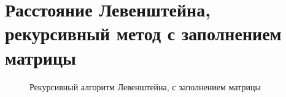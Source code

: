 \documentclass[12pt,a4paper]{report}
\begin{document}
\section*{Расстояние Левенштейна, рекурсивный метод с заполнением матрицы}
\begin{figure}[ht]
	\caption{Рекурсивный алгоритм Левенштейна, с заполнением матрицы}
\end{figure}


\newpage
\end{document}
